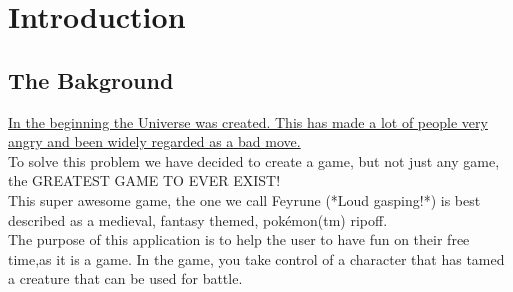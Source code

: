 \section{Introduction}

\begin{comment}
Give some background and explain the purpose of this application. Describe
the functionality of the application. Describe the stakeholders of the project,
highlight who will benefit from/use this particular application.
\end{comment}
\subsection{The Bakground}
\href{https://www.amazon.com/Restaurant-at-End-Universe/dp/0345391810}{
	In the beginning the Universe was created. This has made a lot of people very angry and been widely regarded as a bad move.}\\
To solve this problem we have decided to create a game, but not just any game, the GREATEST GAME TO EVER EXIST!\\
This super awesome game, the one we call Feyrune (*Loud gasping!*) is best described as a medieval, fantasy themed, pokémon(tm) ripoff.\\
The purpose of this application is to help the user to have fun on their free time,as it is a game. In the game, you take control of a character that has tamed a creature that can be used for battle.



